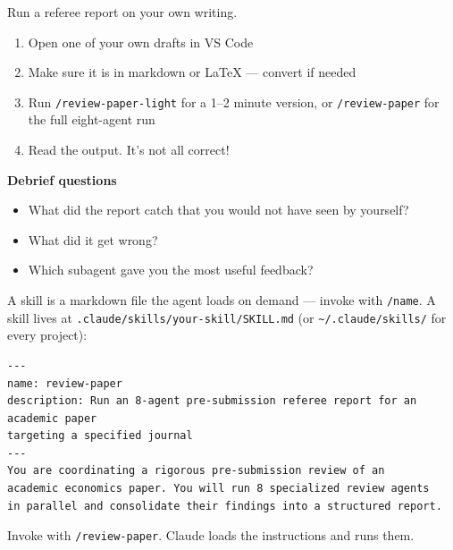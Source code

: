 \documentclass[aspectratio=169, 10pt]{beamer}
\begin{document}
\begin{frame}{Run a referee report on your own writing.}
\vskip0.2cm
\begin{enumerate}
  \item Open one of your own drafts in VS Code
  \item Make sure it is in markdown or LaTeX --- convert if needed
  \item Run \texttt{/review-paper-light} for a 1--2 minute version, or \texttt{/review-paper} for the full eight-agent run
  \item Read the output. It's not all correct! 
\end{enumerate}

\vskip0.4cm
\textbf{Debrief questions}
\begin{itemize}
  \item What did the report catch that you would not have seen by yourself?
  \item What did it get wrong?
  \item Which subagent gave you the most useful feedback?
\end{itemize}
\end{frame}


\begin{frame}[fragile]{A skill is a markdown file the agent loads on demand --- invoke with \texttt{/name}.}
\vskip0.1cm
\small
A skill lives at \texttt{.claude/skills/your-skill/SKILL.md} (or \texttt{\textasciitilde/.claude/skills/} for every project):
\begin{verbatim}
---
name: review-paper
description: Run an 8-agent pre-submission referee report for an academic paper
targeting a specified journal
---
You are coordinating a rigorous pre-submission review of an 
academic economics paper. You will run 8 specialized review agents 
in parallel and consolidate their findings into a structured report.

\end{verbatim}

\vskip0.2cm
Invoke with \texttt{/review-paper}. Claude loads the instructions and runs them.
\end{frame}
\end{document}
